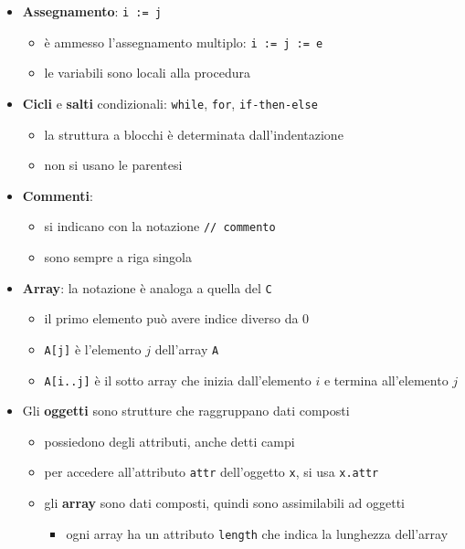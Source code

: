 \documentclass[italian, 10pt]{article}
\begin{document}
\begin{itemize}
  \item \textbf{Assegnamento}: \texttt{i := j}
        \begin{itemize}
          \item è ammesso l'assegnamento multiplo: \texttt{i := j := e}
          \item le variabili sono locali alla procedura
        \end{itemize}
  \item \textbf{Cicli} e \textbf{salti} condizionali: \texttt{while}, \texttt{for}, \texttt{if-then-else}
        \begin{itemize}
          \item la struttura a blocchi è determinata dall'indentazione
          \item non si usano le parentesi
        \end{itemize}
  \item \textbf{Commenti}:
        \begin{itemize}
          \item si indicano con la notazione \texttt{// commento}
          \item sono sempre a riga singola
        \end{itemize}
  \item \textbf{Array}: la notazione è analoga a quella del \texttt{C}
        \begin{itemize}
          \item il primo elemento può avere indice diverso da \(0\)
          \item \texttt{A[j]} è l'elemento \(j\) dell'array \texttt{A}
          \item \texttt{A[i..j]} è il sotto array che inizia dall'elemento \(i\) e termina all'elemento \(j\)
        \end{itemize}
  \item Gli \textbf{oggetti} sono strutture che raggruppano dati composti
        \begin{itemize}
          \item possiedono degli attributi, anche detti campi
          \item per accedere all'attributo \texttt{attr} dell'oggetto \texttt{x}, si usa \texttt{x.attr}
          \item gli \textbf{array} sono dati composti, quindi sono assimilabili ad oggetti
                \begin{itemize}[label=\(\rightarrow\)]
                  \item ogni array ha un attributo \texttt{length} che indica la lunghezza dell'array

\end{itemize}
\end{itemize}
\end{itemize}
\end{document}
